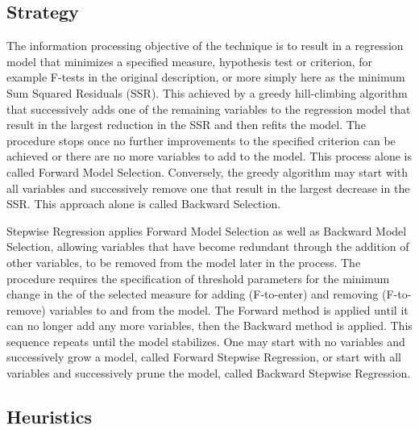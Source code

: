 \subsection{Strategy}
The information processing objective of the technique is to result in a regression model that minimizes a specified measure, hypothesis test or criterion, for example F-tests in the original description, or more simply here as the minimum Sum Squared Residuals (SSR).
This achieved by a greedy hill-climbing algorithm that successively adds one of the remaining variables to the regression model that result in the largest reduction in the SSR and then refits the model. The procedure stops once no further improvements to the specified criterion can be achieved or there are no more variables to add to the model. This process alone is called Forward Model Selection. Conversely, the greedy algorithm may start with all variables and successively remove one that result in the largest decrease in the SSR. This approach alone is called Backward Selection.

Stepwise Regression applies Forward Model Selection as well as Backward Model Selection, allowing variables that have become redundant through the addition of other variables, to be removed from the model later in the process. The procedure requires the specification of threshold parameters for the minimum change in the of the selected measure for adding (F-to-enter) and removing (F-to-remove) variables to and from the model. The Forward method is applied until it can no longer add any more variables, then the Backward method is applied. This sequence repeats until the model stabilizes. One may start with no variables and successively grow a model, called Forward Stepwise Regression, or start with all variables and successively prune the model, called Backward Stepwise Regression.

\subsection{Heuristics}

